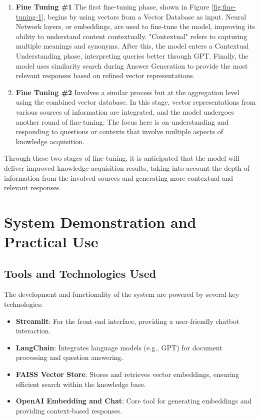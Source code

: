 \documentclass[runningheads]{llncs}
\begin{document}
\begin{enumerate}
    \item \textbf{Fine Tuning \#1} The first fine-tuning phase, shown in Figure \ref{fig:fine-tuning-1}, begins by using vectors from a Vector Database as input. Neural Network layers, or embeddings, are used to fine-tune the model, improving its ability to understand content contextually. "Contextual" refers to capturing multiple meanings and synonyms. After this, the model enters a Contextual Understanding phase, interpreting queries better through GPT. Finally, the model uses similarity search during Answer Generation to provide the most relevant responses based on refined vector representations.
                    
    \item \textbf{Fine Tuning \#2} Involves a similar process but at the aggregation level using the combined vector database. In this stage, vector representations from various sources of information are integrated, and the model undergoes another round of fine-tuning. The focus here is on understanding and responding to questions or contexts that involve multiple aspects of knowledge acquisition.
\end{enumerate}

Through these two stages of fine-tuning, it is anticipated that the model will deliver improved knowledge acquisition results, taking into account the depth of information from the involved sources and generating more contextual and relevant responses.

\section{System Demonstration and Practical Use}
\subsection{Tools and Technologies Used}
The development and functionality of the system are powered by several key technologies:
\begin{itemize}
    \item \textbf{Streamlit}: For the front-end interface, providing a user-friendly chatbot interaction.
    \item \textbf{LangChain}: Integrates language models (e.g., GPT) for document processing and question answering.
    \item \textbf{FAISS Vector Store}: Stores and retrieves vector embeddings, ensuring efficient search within the knowledge base.
    \item \textbf{OpenAI Embedding and Chat}: Core tool for generating embeddings and providing context-based responses.
\end{itemize}
\end{document}
